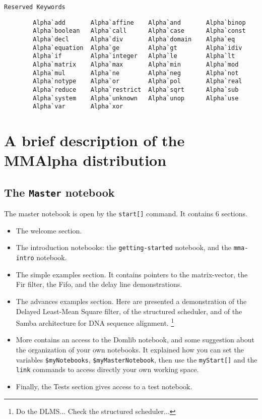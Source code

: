 \documentclass[12pt]{article}
\newcommand{\MMA}{{\sc MMAlpha}}
\newcommand{\MMAlfa}{\MMA}
\begin{document}
\texttt{Reserved Keywords}

\begin{verbatim}
        Alpha`add       Alpha`affine    Alpha`and       Alpha`binop
        Alpha`boolean   Alpha`call      Alpha`case      Alpha`const
        Alpha`decl      Alpha`div       Alpha`domain    Alpha`eq
        Alpha`equation  Alpha`ge        Alpha`gt        Alpha`idiv
        Alpha`if        Alpha`integer   Alpha`le        Alpha`lt
        Alpha`matrix    Alpha`max       Alpha`min       Alpha`mod
        Alpha`mul       Alpha`ne        Alpha`neg       Alpha`not
        Alpha`notype    Alpha`or        Alpha`pol       Alpha`real
        Alpha`reduce    Alpha`restrict  Alpha`sqrt      Alpha`sub
        Alpha`system    Alpha`unknown   Alpha`unop      Alpha`use
        Alpha`var       Alpha`xor
\end{verbatim}

\section{A brief description of the \MMAlfa{} distribution}
\label{mmalphacontent}

\subsection{The \texttt{Master} notebook}
The master notebook is open by the \texttt{start[]} 
command. It contains 6 sections.
\begin{itemize}
\item The welcome section. 
\item The introduction notebooks: the 
\texttt{getting-started}
notebook, and the \texttt{mma-intro}
notebook. 
\item The simple examples section. It contains pointers to the 
matrix-vector, the Fir filter, the Fifo, and the delay line 
demonstrations. 
\item The advances examples section. Here are presented a demonstration
of the Delayed Least-Mean Square filter, of the structured scheduler, 
and of the Samba architecture for DNA sequence alignment.
\footnote{Do the DLMS... Check the structured scheduler...}
\item More contains an access to the Domlib notebook, and some
suggestion about the organization of your own notebooks. It 
explained how you can set the variables \texttt{\$myNotebooks},
\texttt{\$myMasterNotebook}, then use the \texttt{myStart[]} 
and the \texttt{link}
commands to access directly your own working space. 
\item Finally, the Tests section gives access to a test notebook. 
\end{itemize}
\end{document}
